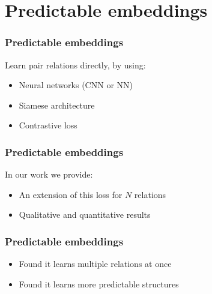 \documentclass[10pt]{beamer}
\begin{document}
\section{Predictable embeddings}
\begin{frame}
    \frametitle{Predictable embeddings}
    Learn pair relations directly, by using:
    \begin{itemize}
        \item Neural networks (CNN or NN)
        \item Siamese architecture
        \item Contrastive loss
    \end{itemize}

\end{frame}

\begin{frame}
    \frametitle{Predictable embeddings}
    In our work we provide:
    \begin{itemize}
        \item An extension of this loss for $N$ relations
        \item Qualitative and quantitative results
    \end{itemize}
\end{frame}

\begin{frame}
    \frametitle{Predictable embeddings}
    \begin{itemize}
        \item Found it learns multiple relations at once
        \item Found it learns more predictable structures
    \end{itemize}
\end{frame}
\end{document}

